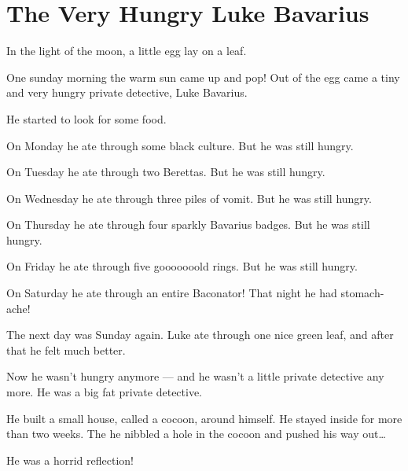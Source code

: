 \chapter{The Very Hungry Luke Bavarius}





In the light of the moon, a little egg lay on a leaf.



One sunday morning the warm sun came up and pop! Out of the egg
came a tiny and very hungry private detective, Luke Bavarius.



He started to look for some food.



On Monday he ate through some black culture. But he was still
hungry.



On Tuesday he ate through two Berettas. But he was still
hungry.



On Wednesday he ate through three piles of vomit. But he was still
hungry.



On Thursday he ate through four sparkly Bavarius badges. But he was
still hungry.



On Friday he ate through five gooooooold rings. But he was still
hungry.



On Saturday he ate through an entire Baconator! That night he had
stomach-ache!



The next day was Sunday again. Luke ate through one nice green
leaf, and after that he felt much better.



Now he wasn't hungry anymore --- and he wasn't a little private
detective any more. He was a big fat private detective.



He built a small house, called a cocoon, around himself. He stayed
inside for more than two weeks. The he nibbled a hole in the cocoon
and pushed his way out{\ldots}



He was a horrid reflection!






